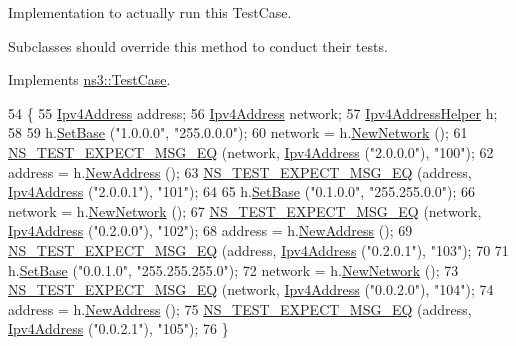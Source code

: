 Implementation to actually run this Test\+Case. 

Subclasses should override this method to conduct their tests. 

Implements \hyperlink{classns3_1_1TestCase_a8ff74680cf017ed42011e4be51917a24}{ns3\+::\+Test\+Case}.


\begin{DoxyCode}
54 \{
55   \hyperlink{classns3_1_1Ipv4Address}{Ipv4Address} address;
56   \hyperlink{classns3_1_1Ipv4Address}{Ipv4Address} network;
57   \hyperlink{classns3_1_1Ipv4AddressHelper}{Ipv4AddressHelper} h;
58 
59   h.\hyperlink{classns3_1_1Ipv4AddressHelper_acf7b16dd25bac67e00f5e25f90a9a035}{SetBase} (\textcolor{stringliteral}{"1.0.0.0"}, \textcolor{stringliteral}{"255.0.0.0"});
60   network = h.\hyperlink{classns3_1_1Ipv4AddressHelper_a3277d133ef0d2669934a16a8206ba8e4}{NewNetwork} ();
61   \hyperlink{group__testing_ga7304ba46a28d8cf08dfdfd6499cf7068}{NS\_TEST\_EXPECT\_MSG\_EQ} (network, \hyperlink{classns3_1_1Ipv4Address}{Ipv4Address} (\textcolor{stringliteral}{"2.0.0.0"}), \textcolor{stringliteral}{"100"});
62   address = h.\hyperlink{classns3_1_1Ipv4AddressHelper_a9d6bc3cd8def204f9c253fce666b2edd}{NewAddress} ();
63   \hyperlink{group__testing_ga7304ba46a28d8cf08dfdfd6499cf7068}{NS\_TEST\_EXPECT\_MSG\_EQ} (address, \hyperlink{classns3_1_1Ipv4Address}{Ipv4Address} (\textcolor{stringliteral}{"2.0.0.1"}), \textcolor{stringliteral}{"101"});
64 
65   h.\hyperlink{classns3_1_1Ipv4AddressHelper_acf7b16dd25bac67e00f5e25f90a9a035}{SetBase} (\textcolor{stringliteral}{"0.1.0.0"}, \textcolor{stringliteral}{"255.255.0.0"});
66   network = h.\hyperlink{classns3_1_1Ipv4AddressHelper_a3277d133ef0d2669934a16a8206ba8e4}{NewNetwork} ();
67   \hyperlink{group__testing_ga7304ba46a28d8cf08dfdfd6499cf7068}{NS\_TEST\_EXPECT\_MSG\_EQ} (network, \hyperlink{classns3_1_1Ipv4Address}{Ipv4Address} (\textcolor{stringliteral}{"0.2.0.0"}), \textcolor{stringliteral}{"102"});
68   address = h.\hyperlink{classns3_1_1Ipv4AddressHelper_a9d6bc3cd8def204f9c253fce666b2edd}{NewAddress} ();
69   \hyperlink{group__testing_ga7304ba46a28d8cf08dfdfd6499cf7068}{NS\_TEST\_EXPECT\_MSG\_EQ} (address, \hyperlink{classns3_1_1Ipv4Address}{Ipv4Address} (\textcolor{stringliteral}{"0.2.0.1"}), \textcolor{stringliteral}{"103"});
70 
71   h.\hyperlink{classns3_1_1Ipv4AddressHelper_acf7b16dd25bac67e00f5e25f90a9a035}{SetBase} (\textcolor{stringliteral}{"0.0.1.0"}, \textcolor{stringliteral}{"255.255.255.0"});
72   network = h.\hyperlink{classns3_1_1Ipv4AddressHelper_a3277d133ef0d2669934a16a8206ba8e4}{NewNetwork} ();
73   \hyperlink{group__testing_ga7304ba46a28d8cf08dfdfd6499cf7068}{NS\_TEST\_EXPECT\_MSG\_EQ} (network, \hyperlink{classns3_1_1Ipv4Address}{Ipv4Address} (\textcolor{stringliteral}{"0.0.2.0"}), \textcolor{stringliteral}{"104"});
74   address = h.\hyperlink{classns3_1_1Ipv4AddressHelper_a9d6bc3cd8def204f9c253fce666b2edd}{NewAddress} ();
75   \hyperlink{group__testing_ga7304ba46a28d8cf08dfdfd6499cf7068}{NS\_TEST\_EXPECT\_MSG\_EQ} (address, \hyperlink{classns3_1_1Ipv4Address}{Ipv4Address} (\textcolor{stringliteral}{"0.0.2.1"}), \textcolor{stringliteral}{"105"});
76 \}
\end{DoxyCode}


